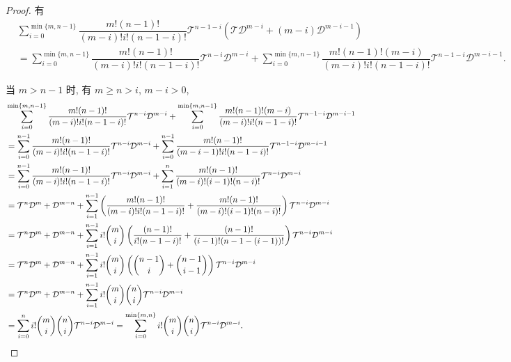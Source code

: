 \documentclass{ctexart}
\begin{document}
\begin{proof}
    有
    \begin{align*}
        & \sum\limits_{i=0}^{\min\{m,n-1\}}\dfrac{m!(n-1)!}{(m-i)!i!(n-1-i)!}\mathcal{T}^{n-1-i}(\mathcal{T}\mathcal{D}^{m-i}+(m-i)\mathcal{D}^{m-i-1}) \\
        & =\sum\limits_{i=0}^{\min\{m,n-1\}}\dfrac{m!(n-1)!}{(m-i)!i!(n-1-i)!}\mathcal{T}^{n-i}\mathcal{D}^{m-i}+\sum\limits_{i=0}^{\min\{m,n-1\}}\dfrac{m!(n-1)!(m-i)}{(m-i)!i!(n-1-i)!}\mathcal{T}^{n-1-i}\mathcal{D}^{m-i-1}.
    \end{align*}

    当 $m>n-1$ 时, 有 $m\geq n>i$, $m-i>0$,
    \begin{align*}
        & \sum\limits_{i=0}^{\min\{m,n-1\}}\dfrac{m!(n-1)!}{(m-i)!i!(n-1-i)!}\mathcal{T}^{n-i}\mathcal{D}^{m-i}+\sum\limits_{i=0}^{\min\{m,n-1\}}\dfrac{m!(n-1)!(m-i)}{(m-i)!i!(n-1-i)!}\mathcal{T}^{n-1-i}\mathcal{D}^{m-i-1} \\
        & =\sum\limits_{i=0}^{n-1}\dfrac{m!(n-1)!}{(m-i)!i!(n-1-i)!}\mathcal{T}^{n-i}\mathcal{D}^{m-i}+\sum\limits_{i=0}^{n-1}\dfrac{m!(n-1)!}{(m-i-1)!i!(n-1-i)!}\mathcal{T}^{n-1-i}\mathcal{D}^{m-i-1} \\
        & =\sum\limits_{i=0}^{n-1}\dfrac{m!(n-1)!}{(m-i)!i!(n-1-i)!}\mathcal{T}^{n-i}\mathcal{D}^{m-i}+\sum\limits_{i=1}^n\dfrac{m!(n-1)!}{(m-i)!(i-1)!(n-i)!}\mathcal{T}^{n-i}\mathcal{D}^{m-i} \\
        & =\mathcal{T}^{n}\mathcal{D}^{m}+\mathcal{D}^{m-n}+\sum\limits_{i=1}^{n-1}\left(\dfrac{m!(n-1)!}{(m-i)!i!(n-1-i)!}+\dfrac{m!(n-1)!}{(m-i)!(i-1)!(n-i)!}\right)\mathcal{T}^{n-i}\mathcal{D}^{m-i} \\
        & =\mathcal{T}^{n}\mathcal{D}^{m}+\mathcal{D}^{m-n}+\sum\limits_{i=1}^{n-1}i!\dbinom{m}{i}\left(\dfrac{(n-1)!}{i!(n-1-i)!}+\dfrac{(n-1)!}{(i-1)!(n-1-(i-1))!}\right)\mathcal{T}^{n-i}\mathcal{D}^{m-i} \\
        & =\mathcal{T}^{n}\mathcal{D}^{m}+\mathcal{D}^{m-n}+\sum\limits_{i=1}^{n-1}i!\dbinom{m}{i}\left(\dbinom{n-1}{i}+\dbinom{n-1}{i-1}\right)\mathcal{T}^{n-i}\mathcal{D}^{m-i} \\
        & =\mathcal{T}^{n}\mathcal{D}^{m}+\mathcal{D}^{m-n}+\sum\limits_{i=1}^{n-1}i!\dbinom{m}{i}\dbinom{n}{i}\mathcal{T}^{n-i}\mathcal{D}^{m-i} \\
        & =\sum\limits_{i=0}^ni!\dbinom{m}{i}\dbinom{n}{i}\mathcal{T}^{n-i}\mathcal{D}^{m-i}=\sum\limits_{i=0}^{\min\{m,n\}}i!\dbinom{m}{i}\dbinom{n}{i}\mathcal{T}^{n-i}\mathcal{D}^{m-i}.
    \end{align*}


\end{proof}
\end{document}
